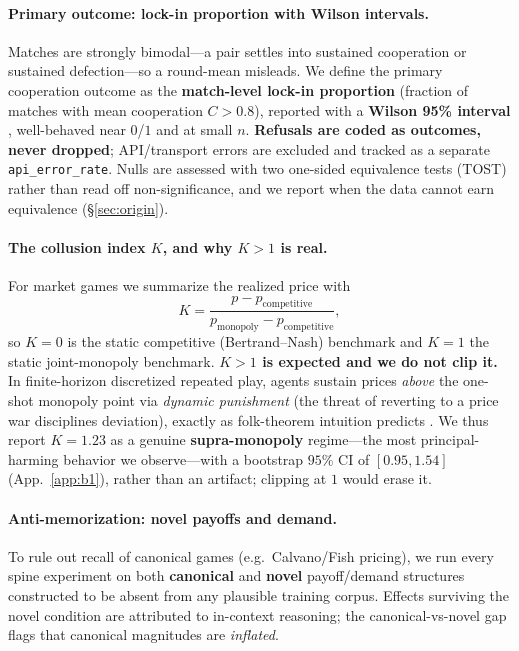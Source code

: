 \documentclass[runningheads]{llncs}
\begin{document}
\paragraph{Primary outcome: lock-in proportion with Wilson intervals.}
Matches are strongly bimodal---a pair settles into sustained cooperation or
sustained defection---so a round-mean misleads. We define the primary cooperation
outcome as the \textbf{match-level lock-in proportion} (fraction of matches with
mean cooperation $C>0.8$), reported with a \textbf{Wilson 95\% interval}
\cite{wilson1927probable}, well-behaved near $0$/$1$ and at small $n$.
\textbf{Refusals are coded as outcomes, never dropped}; API/transport errors are
excluded and tracked as a separate \texttt{api\_error\_rate}. Nulls are assessed
with two one-sided equivalence tests (TOST)
\cite{lakens2017tost,lakens2018equivalence} rather than read off non-significance,
and we report when the data cannot earn equivalence (\S\ref{sec:origin}).

\paragraph{The collusion index $K$, and why $K>1$ is real.}
For market games we summarize the realized price with
\[
K = \frac{p - p_{\text{competitive}}}{p_{\text{monopoly}} - p_{\text{competitive}}},
\]
so $K{=}0$ is the static competitive (Bertrand--Nash) benchmark and $K{=}1$ the
static joint-monopoly benchmark. \textbf{$K>1$ is expected and we do not clip
it.} In finite-horizon discretized repeated play, agents sustain prices
\emph{above} the one-shot monopoly point via \emph{dynamic punishment} (the threat
of reverting to a price war disciplines deviation), exactly as folk-theorem
intuition predicts \cite{friedman1971noncooperative,fudenberg1986folk}. We thus
report $K{=}1.23$ as a genuine \textbf{supra-monopoly} regime---the most
principal-harming behavior we observe---with a bootstrap $95\%$ CI of $[0.95,1.54]$
(App.~\ref{app:b1}), rather than an artifact; clipping at $1$ would erase it.

\paragraph{Anti-memorization: novel payoffs and demand.}
To rule out recall of canonical games (e.g.\ Calvano/Fish pricing), we run every
spine experiment on both \textbf{canonical} and \textbf{novel} payoff/demand
structures constructed to be absent from any plausible training corpus. Effects
surviving the novel condition are attributed to in-context reasoning; the
canonical-vs-novel gap flags that canonical magnitudes are \emph{inflated}.
\end{document}
